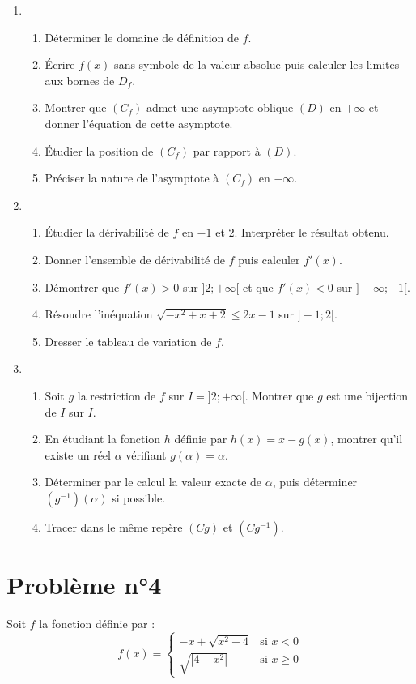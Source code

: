 \documentclass[12pt]{article}
\begin{document}
\begin{enumerate}
    \item 
\begin{enumerate}
		\item[(a)] Déterminer le domaine de définition de $f$.
    \item[(b)] Écrire $f(x)$ sans symbole de la valeur absolue puis calculer les limites aux bornes de $D_f$.
    \item[(c)] Montrer que $(C_f)$ admet une asymptote oblique $(D)$ en $+\infty$ et donner l’équation de cette asymptote.
    \item[(d)] Étudier la position de $(C_f)$ par rapport à $(D)$.
    \item[(e)] Préciser la nature de l’asymptote à $(C_f)$ en $-\infty$.
\end{enumerate}

\item
\begin{enumerate}
    \item[(a)] Étudier la dérivabilité de $f$ en $-1$ et $2$. Interpréter le résultat obtenu.
    \item[(b)] Donner l’ensemble de dérivabilité de $f$ puis calculer $f'(x)$.
    \item[(c)] Démontrer que $f'(x) > 0$ sur $]2; +\infty[$ et que $f'(x) < 0$ sur $]-\infty; -1[$.
    \item[(d)] Résoudre l’inéquation $\sqrt{-x^2 + x + 2} \leq 2x - 1$ sur $]-1; 2[$.
    \item[(e)] Dresser le tableau de variation de $f$.
\end{enumerate}

\item
\begin{enumerate}
    \item[(a)] Soit $g$ la restriction de $f$ sur $I = ]2; +\infty[$. Montrer que $g$ est une bijection de $I$ sur $I$.
    \item[(b)] En étudiant la fonction $h$ définie par $h(x) = x - g(x)$, montrer qu’il existe un réel $\alpha$ vérifiant $g(\alpha) = \alpha$.
    \item[(c)] Déterminer par le calcul la valeur exacte de $\alpha$, puis déterminer $(g^{-1})(\alpha)$ si possible.
    \item[(d)] Tracer dans le même repère $(Cg)$ et $(Cg^{-1})$.
\end{enumerate}
\end{enumerate}
\section*{Problème n°4}
Soit $f$ la fonction définie par :
\[
f(x) =
\begin{cases}
-x + \sqrt{x^2 + 4} & \text{si } x < 0 \\
\sqrt{|4 - x^2|} & \text{si } x \geq 0
\end{cases}
\]
\end{document}

